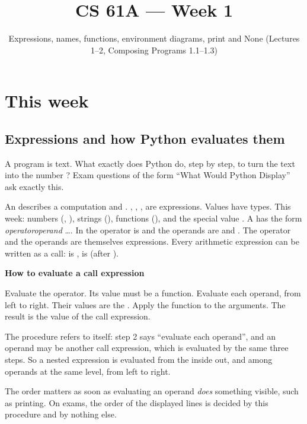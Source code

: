 \documentclass[10pt]{scrartcl}
\title{CS 61A --- Week 1}
\subtitle{Expressions, names, functions, environment diagrams, print and None (Lectures 1--2, Composing Programs 1.1--1.3)}
\author{}\date{}\ihead{}
\newenvironment{howto}[1]{\begin{mdframed}[style=howtostyle]{\color{NavyBlue}\textbf{#1}}\par\vspace{2pt}}{\end{mdframed}}
\begin{document}
\maketitle

\section{This week}

\subsection{Expressions and how Python evaluates them}

\begin{qbox}
  A program is text. What exactly does Python do, step by step, to turn the text  into the number ? Exam questions of the form ``What Would Python Display'' ask exactly this.
\end{qbox}

\begin{itemize}
  \ii An  describes a computation and . , , ,  are expressions.
  \ii Values have types. This week: numbers (, ), strings (), functions (), and the special value .
  \ii A  has the form \emph{operator}\cd{(}\emph{operand}\cd{,} \dots\cd{)}. In  the operator is  and the operands are  and . The operator and the operands are themselves expressions.
  \ii Every arithmetic expression can be written as a call:  is ,  is  (after ).
\end{itemize}

\begin{howto}{How to evaluate a call expression}
\begin{steps}
  \ii Evaluate the operator. Its value must be a function.
  \ii Evaluate each operand, from left to right. Their values are the .
  \ii Apply the function to the arguments. The result is the value of the call expression.
\end{steps}
\end{howto}
\begin{ideabox}
The procedure refers to itself: step 2 says ``evaluate each operand'', and an operand may be another call expression, which is evaluated by the same three steps. So a nested expression is evaluated from the inside out, and among operands at the same level, from left to right.

The order matters as soon as evaluating an operand \emph{does} something visible, such as printing. On exams, the order of the displayed lines is decided by this procedure and by nothing else.
\end{ideabox}
\end{document}
